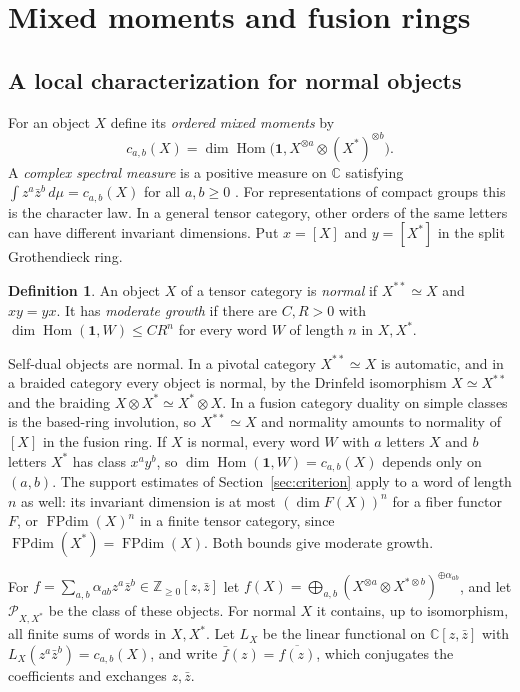 \documentclass[11pt,reqno]{amsart}
\theoremstyle{definition}
\newtheorem{definition}[theorem]{Definition}
\newcommand{\Hom}{\operatorname{Hom}}
\newcommand{\FPdim}{\operatorname{FPdim}}
\newcommand{\one}{\mathbf 1}
\newcommand{\CC}{\mathbb C}
\newcommand{\ZZ}{\mathbb Z}
\begin{document}
\section{Mixed moments and fusion rings}\label{sec:complex}
\subsection{A local characterization for normal objects}

For an object $X$ define its \emph{ordered mixed moments} by
\[
 c_{a,b}(X)=\dim\Hom\bigl(\one,X^{\otimes a}\otimes (X^*)^{\otimes b}\bigr).
\]
A \emph{complex spectral measure} is a positive measure on $\CC$ satisfying $\int z^a\bar z^b\,d\mu=c_{a,b}(X)$ for all $a,b\geq0$ \cite[Definition~1.1]{FFK}. For representations of compact groups this is the character law. In a general tensor category, other orders of the same letters can have different invariant dimensions. Put $x=[X]$ and $y=[X^*]$ in the split Grothendieck ring.

\begin{definition}\label{def:normal}
An object $X$ of a tensor category is \emph{normal} if $X^{**}\simeq X$ and $xy=yx$. It has \emph{moderate growth} if there are $C,R>0$ with $\dim\Hom(\one,W)\leq CR^n$ for every word $W$ of length $n$ in $X,X^*$.
\end{definition}

Self-dual objects are normal. In a pivotal category $X^{**}\simeq X$ is automatic, and in a braided category every object is normal, by the Drinfeld isomorphism $X\simeq X^{**}$ and the braiding $X\otimes X^*\simeq X^*\otimes X$. In a fusion category duality on simple classes is the based-ring involution,
so $X^{**}\simeq X$ and normality amounts to normality of $[X]$ in the fusion ring. If $X$ is normal, every word $W$ with $a$ letters $X$ and $b$ letters $X^*$ has class $x^ay^b$, so $\dim\Hom(\one,W)=c_{a,b}(X)$ depends only on $(a,b)$. The support estimates of Section~\ref{sec:criterion} apply to a word of length $n$ as well: its invariant dimension is at most $(\dim F(X))^n$ for a fiber functor $F$, or $\FPdim(X)^n$ in a finite tensor category, since $\FPdim(X^*)=\FPdim(X)$. Both bounds give moderate growth.

For $f=\sum_{a,b}\alpha_{ab}z^a\bar z^b\in\ZZ_{\geq0}[z,\bar z]$ let $f(X)=\bigoplus_{a,b}(X^{\otimes a}\otimes X^{*\otimes b})^{\oplus\alpha_{ab}}$, and let $\mathcal P_{X,X^*}$ be the class of these objects. For normal $X$ it contains, up to isomorphism, all finite sums of words in $X,X^*$. Let $L_X$ be the linear functional on $\CC[z,\bar z]$ with $L_X(z^a\bar z^b)=c_{a,b}(X)$, and write $\bar f(z)=\overline{f(z)}$, which conjugates the coefficients and exchanges $z,\bar z$.
\end{document}
